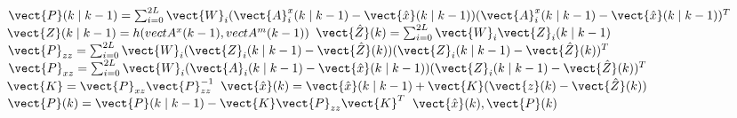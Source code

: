 \begin{algorithm}
\begin{algorithmic}
	\STATE   $ \vect{P}(k \mid k-1) = \sum_{i=0}^{2L} \vect{W}_{i} (\vect{A}^{x}_{i}(k \mid k-1) - \vect{\hat{x}}(k \mid k-1)) 
																   (\vect{A}^{x}_{i}(k \mid k-1) - \vect{\hat{x}}(k \mid k-1))^{T} $
	\STATE   $\vect{Z}(k \mid k-1) = h(vect{A}^{x}(k-1), vect{A}^{m}(k-1)) $
	\STATE   $\vect{\hat{Z}}(k) =  \sum_{i=0}^{2L} \vect{W}_{i} \vect{Z}_{i}(k \mid k-1)$
	\STATE   $\vect{P}_{zz} =  \sum_{i=0}^{2L} \vect{W}_{i} (\vect{Z}_{i}(k \mid k-1)-\vect{\hat{Z}}(k)) 
															(\vect{Z}_{i}(k \mid k-1)-\vect{\hat{Z}}(k))^{T}$
	\STATE   $\vect{P}_{xz} =  \sum_{i=0}^{2L} \vect{W}_{i} (\vect{A}_{i}(k \mid k-1)-\vect{\hat{x}}(k \mid k-1))
															(\vect{Z}_{i}(k \mid k-1)-\vect{\hat{Z}}(k))^{T}$
	\STATE   $\vect{K}      = \vect{P}_{xz} \vect{P}_{zz}^{-1}$
	\STATE	 $ \vect{\hat{x}}(k) = \vect{\hat{x}}(k \mid k-1) + \vect{K} (\vect{z}(k) - \vect{\hat{Z}}(k))  $
	\STATE   $ \vect{P}(k) = \vect{P}(k \mid k-1) - \vect{K} \vect{P}_{zz} \vect{K}^{T} $
	\RETURN $\vect{\hat{x}}(k), \vect{P}(k)$
\ENDLOOP
\end{algorithmic}
\end{algorithm}